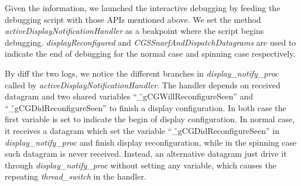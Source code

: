 Given the information, we launched the interactive debugging by 
feeding the debugging script with those APIs mentioned above. We set the method
\textit{activeDisplayNotificationHandler} as a beakpoint where the script begins
debugging. \textit{displayReconfigured} and \textit{CGSSnarfAndDispatchDatagrams}
are used to indicate the end of debugging for the normal case and spinning case
respectively.

By diff the two logs, we notice the different
branches in \textit{display\_notify\_proc} called by
\textit{activeDisplayNotificationHandler}. The handler depends on received
datagram and two shared variables ``\v{\_gCGWillReconfigureSeen}'' and
``\v{\_gCGDidReconfigureSeen}'' to finish a display configuration. In
both case the first variable is set to indicate the begin of display
configuration. In normal case, it receives a datagram which set the variable
``\v{\_gCGDidReconfigureSeen}'' in \textit{display\_notify\_proc} and
finish display reconfiguration, while in the spinning case such datagram
is never received. Instead, an alternative datagram just drive it through
\textit{display\_notify\_proc} without setting any variable, which causes the
repeating \textit{thread\_switch} in the handler.
